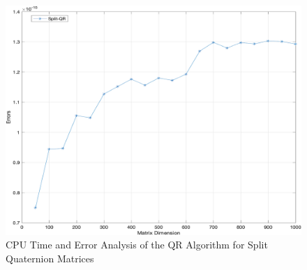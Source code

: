 \documentclass{book}
\theoremstyle{remark}
\begin{document}
\begin{multicols}{2}
\begin{figure}[H]
\begin{minipage}[b]{0.45\textwidth}
    \end{minipage}
    \hfill %
    \begin{minipage}[b]{0.45\textwidth}
        \centering
        \includegraphics[width=\textwidth]{Figure_3.png} %
    \end{minipage}
    \caption{ CPU Time and Error Analysis of the QR Algorithm for Split Quaternion Matrices }
     \label{fig:Figure_2}
\end{figure}


\end{multicols}
\end{document}
